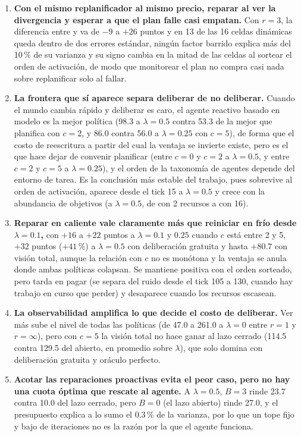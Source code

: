 \begin{enumerate}[leftmargin=1.8em, itemsep=0.35em]
  \item \textbf{Con el mismo replanificador al mismo precio, reparar al ver la divergencia y esperar a que el plan falle casi empatan.} Con $r=3$, la diferencia entre \OL{} y \CL{} va de $-9$ a $+26$ puntos y en 13 de las 16 celdas dinámicas queda dentro de dos errores estándar, ningún factor barrido explica más del 10\,\% de su varianza y su signo cambia en la mitad de las celdas al sortear el orden de activación, de modo que monitorear el plan no compra casi nada sobre replanificar solo al fallar.
  \item \textbf{La frontera que sí aparece separa deliberar de no deliberar.} Cuando el mundo cambia rápido y deliberar es caro, el agente reactivo basado en modelo es la mejor política (98.3 a $\lambda=0.5$ contra 53.3 de la mejor que planifica con $c=2$, y 86.0 contra 56.0 a $\lambda=0.25$ con $c=5$), de forma que el costo de reescritura a partir del cual la ventaja se invierte existe, pero es el que hace dejar de convenir planificar (entre $c=0$ y $c=2$ a $\lambda=0.5$, y entre $c=2$ y $c=5$ a $\lambda=0.25$), y el orden de la taxonomía de agentes depende del entorno de tarea. Es la conclusión más estable del trabajo, pues sobrevive al orden de activación, aparece desde el tick 15 a $\lambda=0.5$ y crece con la abundancia de objetivos (a $\lambda=0.5$, de  con 2 recursos a  con 16).
  \item \textbf{Reparar en caliente vale claramente más que reiniciar en frío desde $\lambda=0.1$,} con $+16$ a $+22$ puntos a $\lambda=0.1$ y $0.25$ cuando $c$ está entre 2 y 5, $+32$ puntos ($+41$\,\%) a $\lambda=0.5$ con deliberación gratuita y hasta $+80.7$ con visión total, aunque la relación con $c$ no es monótona y la ventaja se anula donde ambas políticas colapsan. Se mantiene positiva con el orden sorteado, pero tarda en pagar (se separa del ruido desde el tick 105 a 130, cuando hay trabajo en curso que perder) y desaparece cuando los recursos escasean.
  \item \textbf{La observabilidad amplifica lo que decide el costo de deliberar.} Ver más sube el nivel de todas las políticas (de 47.0 a 261.0 a $\lambda=0$ entre $r=1$ y $r=\infty$), pero con $c=5$ la visión total no hace ganar al lazo cerrado (114.5 contra 129.5 del abierto, en promedio sobre $\lambda$), que solo domina con deliberación gratuita y oráculo perfecto.
  \item \textbf{Acotar las reparaciones proactivas evita el peor caso, pero no hay una cuota óptima que rescate al agente.} A $\lambda=0.5$, $B=3$ rinde 23.7 contra 10.0 del lazo cerrado, pero $B=0$ (el lazo abierto) rinde 27.0, y el presupuesto explica a lo sumo el 0.3\,\% de la varianza, por lo que un tope fijo y bajo de iteraciones no es la razón por la que el agente funciona.

\end{enumerate}
